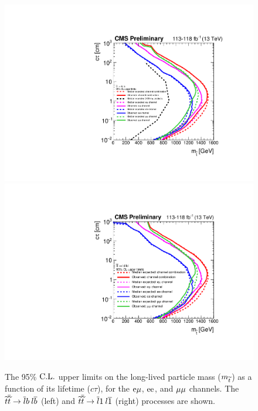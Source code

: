 \begin{figure}[hbtp]
\centering
\includegraphics[scale=0.39]{figures/results/2DlimitsStopToLB.pdf}
\includegraphics[scale=0.39]{figures/results/2DlimitsStopToLD.pdf}
\caption{The 95\% $\text{C.L.}$ upper limits on the long-lived particle mass ($m_{\widetilde{t}}$) as a function of its lifetime ($c\tau$), for the $\mathrm{e}{\mu}$, $\mathrm{e}\mathrm{e}$, and ${\mu}{\mu}$ channels. The $\widetilde{t}\overline{\widetilde{t}} \to \overline{l}b\:l\overline{b} $ (left) and $\widetilde{t}\overline{\widetilde{t}} \to \overline{l}1\:l\overline{1}$ (right) processes are shown.} 
\label{limits_individual}
\end{figure}

